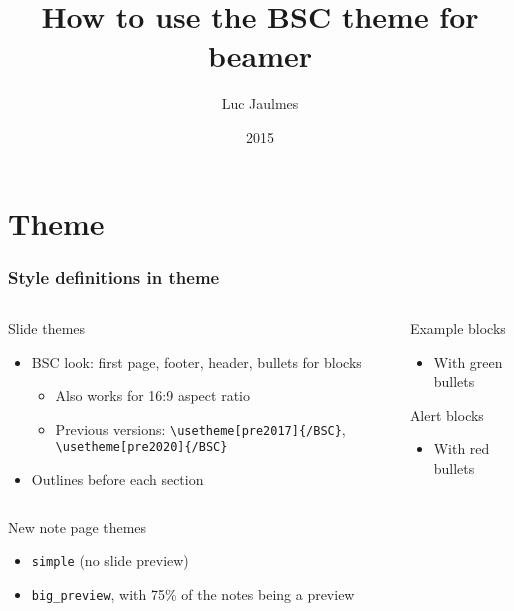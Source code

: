 \documentclass[aspectratio=169,c,12pt]{beamer}
\title[BSC styled beamer tutorial]{How to use the BSC theme for beamer}
\author{Luc Jaulmes}
\date{2015}
\begin{document}
\begin{frame}
\titlepage
\end{frame}

\section{Theme}

\begin{frame}[fragile]
	\frametitle{Style definitions in theme}
	\begin{columns}[T]
		\begin{column}{.75\linewidth}
			\begin{block}{Slide themes}
				\begin{itemize}
					\item BSC look: first page, footer, header, bullets for blocks
					\begin{itemize}
						\item Also works for 16:9 aspect ratio
						\item Previous versions: \verb|\usetheme[pre2017]{/BSC}|, \verb|\usetheme[pre2020]{/BSC}|
					\end{itemize}
					\item Outlines before each section
				\end{itemize}
			\end{block}
		\end{column}
		\begin{column}{.3\linewidth}
			\begin{exampleblock}{Example blocks}
				\begin{itemize}
					\item With green bullets
				\end{itemize}
			\end{exampleblock}
			\begin{alertblock}{Alert blocks}
				\begin{itemize}
					\item With red bullets
				\end{itemize}
			\end{alertblock}
		\end{column}
	\end{columns}
	\pause
	\begin{columns}
		\begin{column}{.4\linewidth}
			\begin{block}{New note page themes}
				\begin{itemize}
					\item \verb|simple| (no slide preview)
					\item \verb|big_preview|, with 75\% of the notes being a preview
				\end{itemize}%
			\end{block}
		\end{column}
		\begin{column}{.65\linewidth}
		\end{column}
	\end{columns}
\end{frame}
\end{document}
